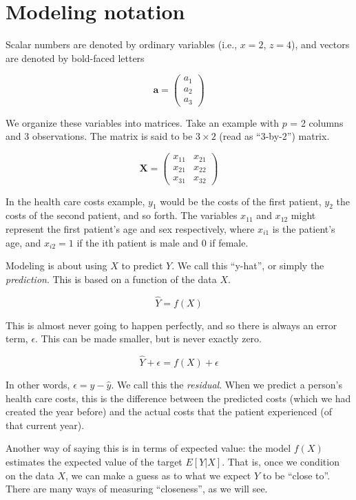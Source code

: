 \documentclass[
  openany]{book}
\begin{document}
\hypertarget{modeling-notation}{%
\section{Modeling notation}\label{modeling-notation}}

Scalar numbers are denoted by ordinary variables (i.e., \(x = 2\), \(z = 4\)), and vectors are denoted by bold-faced letters

\[\mathbf{a} = \begin{pmatrix} a_1 \\ a_2 \\ a_3 \end{pmatrix}\]

We organize these variables into matrices. Take an example with \(p\) = 2 columns and 3 observations. The matrix is said to be \(3 \times 2\) (read as ``3-by-2'') matrix.

\[
\mathbf{X} = \begin{pmatrix}x_{11} & x_{21}\\
x_{21} & x_{22}\\
x_{31} & x_{32}
\end{pmatrix}
\]

In the health care costs example, \(y_1\) would be the costs of the first patient, \(y_2\) the costs of the second patient, and so forth. The variables \(x_{11}\) and \(x_{12}\) might represent the first patient's age and sex respectively, where \(x_{i1}\) is the patient's age, and \(x_{i2} = 1\) if the ith patient is male and 0 if female.

Modeling is about using \(X\) to predict \(Y\). We call this ``y-hat'', or simply the \emph{prediction}. This is based on a function of the data \(X\).

\[\hat{Y} = f(X)\]

This is almost never going to happen perfectly, and so there is always an error term, \(\epsilon\). This can be made smaller, but is never exactly zero.

\[
\hat{Y} + \epsilon = f(X) + \epsilon
\]

In other words, \(\epsilon = y - \hat{y}\). We call this the \emph{residual}. When we predict a person's health care costs, this is the difference between the predicted costs (which we had created the year before) and the actual costs that the patient experienced (of that current year).

Another way of saying this is in terms of expected value: the model \(f(X)\) estimates the expected value of the target \(E[Y|X]\). That is, once we condition on the data \(X\), we can make a guess as to what we expect \(Y\) to be ``close to''. There are many ways of measuring ``closeness'', as we will see.
\end{document}
